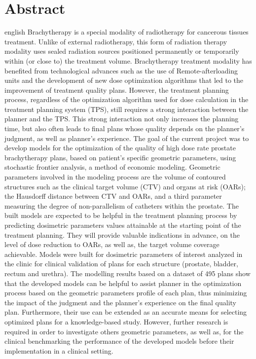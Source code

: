 \chapter*{Abstract}                      %
\begin{otherlanguage*}{english}
Brachytherapy is a special modality of radiotherapy for cancerous tissues treatment. Unlike of external radiotherapy, this form of radiation therapy modality uses sealed radiation sources positioned permanently or temporarily within (or close to) the treatment volume. Brachytherapy treatment modality has benefited from technological advances such as the use of Remote-afterloading units and the development of new dose optimization algorithms that led to the improvement of treatment quality plans. However, the treatment planning process, regardless of the optimization algorithm used for dose calculation in the treatment planning system (TPS), still requires a strong interaction between the planner and the TPS. This strong interaction not only increases the planning time, but also often leads to final plans whose quality depends on the planner's judgment, as well as planner's experience. The goal of the current project was to develop models for the optimization of the quality of high dose rate prostate brachytherapy plans, based on patient’s specific geometric parameters, using stochastic frontier analysis, a method of economic modeling. Geometric parameters involved in the modeling process are the volume of contoured structures such as the clinical target volume (CTV) and organs at risk (OARs); the Hausdorff distance between CTV and OARs, and a third parameter measuring the degree of non-parallelism of catheters within the prostate. The built models are expected to be helpful in the treatment planning process by predicting dosimetric parameters values attainable at the starting point of the treatment planning. They will provide valuable indications in advance, on the level of dose reduction to OARs, as well as, the target volume coverage achievable. Models were built for dosimetric parameters of interest analyzed in the clinic for clinical validation of plans for each structure (prostate, bladder, rectum and urethra). The modelling results based on a dataset of 495 plans show that the developed models can be helpful to assist planner in the optimization process based on the geometric parameters profile of each plan, thus minimizing the impact of the judgment and the planner's experience on the final quality plan. Furthermore, their use can be extended as an accurate means for selecting optimized plans for a knowledge-based study. However, further research is required in order to investigate others geometric parameters, as well as, for the clinical benchmarking the performance of the developed models before their implementation in a clinical setting.
\end{otherlanguage*}
